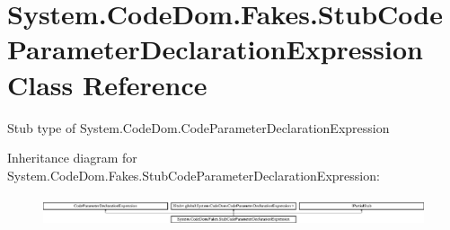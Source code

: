 \hypertarget{class_system_1_1_code_dom_1_1_fakes_1_1_stub_code_parameter_declaration_expression}{\section{System.\-Code\-Dom.\-Fakes.\-Stub\-Code\-Parameter\-Declaration\-Expression Class Reference}
\label{class_system_1_1_code_dom_1_1_fakes_1_1_stub_code_parameter_declaration_expression}
}


Stub type of System.\-Code\-Dom.\-Code\-Parameter\-Declaration\-Expression 


Inheritance diagram for System.\-Code\-Dom.\-Fakes.\-Stub\-Code\-Parameter\-Declaration\-Expression\-:\begin{figure}[H]
\begin{center}
\leavevmode
\includegraphics[height=0.872274cm]{class_system_1_1_code_dom_1_1_fakes_1_1_stub_code_parameter_declaration_expression}
\end{center}
\end{figure}
